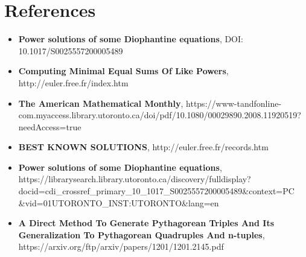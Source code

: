 \documentclass{article}
\begin{document}
\section{References}
\begin{itemize}
    \item {\bf Power solutions of some Diophantine equations}, DOI: 10.1017/S0025557200005489
    \item {\bf Computing Minimal Equal Sums Of Like Powers}, http://euler.free.fr/index.htm
    \item {\bf The American Mathematical Monthly}, https://www-tandfonline-com.myaccess.library.utoronto.ca/doi/pdf/10.1080/00029890.2008.11920519?needAccess=true
    \item {\bf BEST KNOWN SOLUTIONS}, http://euler.free.fr/records.htm
    \item {\bf Power solutions of some Diophantine equations}, \\
    https://librarysearch.library.utoronto.ca/discovery/fulldisplay?\\
    docid=cdi\_crossref\_primary\_10\_1017\_S0025557200005489\&context=PC\\
    \&vid=01UTORONTO\_INST:UTORONTO\&lang=en
    \item {\bf A Direct Method To Generate Pythagorean Triples And Its Generalization To Pythagorean Quadruples And n-tuples},\\ 
    https://arxiv.org/ftp/arxiv/papers/1201/1201.2145.pdf
\end{itemize}
\end{document}
